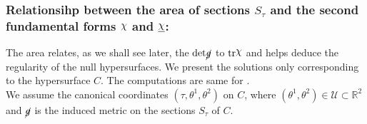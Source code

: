 \documentclass[12pt, a4paper]{report}
\theoremstyle{bfnote}
\newcommand{\underit}[1]{\textit{\underbar{#1}}}
\newcommand{\chits}{\raisebox{0.5ex}{$\chi$}} %
\begin{document}
\subsubsection*{Relationsihp between the area of sections $S_\tau$ and the second fundamental forms $\chits$
and $\underit{\chits}$:} 
The area relates, as we shall see later, the
$\mathrm{det}\cancel{g}$ to $\mathrm{tr}\chits$ and helps deduce the regularity of the
null hypersurfaces. We present the solutions only corresponding to the
hypersurface $C$. The computations are same for \underit{C}.\\
We assume the canonical coordinates $\left(\tau, \theta^1, \theta^2\right)$ on
$C$, where $\left(\theta^1, \theta^2\right) \in \mathcal{U} \subset \mathbb{R}^2$
and $\cancel{g}$ is the induced metric on the sections $S_\tau$ of $C$.
\end{document}
